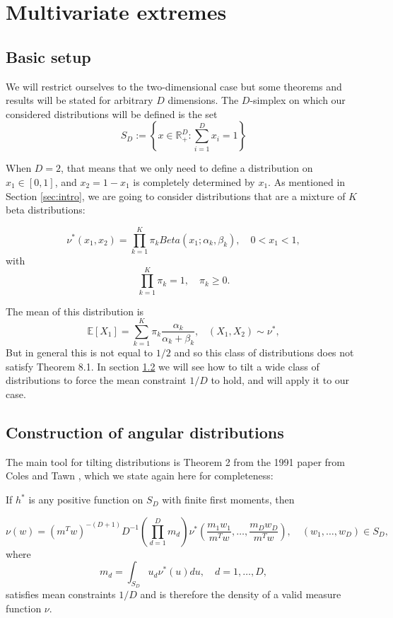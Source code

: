 \chapter{Multivariate extremes}
\label{sec:multivariate}
\section{Basic setup}

We will restrict ourselves to the two-dimensional case but some theorems and results will be stated for arbitrary $D$ dimensions. The $D$-simplex on which our considered distributions will be defined is the set
$$
S_D :=\left\{x \in \mathbb{R}^D_+ : \sum_{i=1}^D x_i = 1\right\}
$$

When $D=2$, that means that we only need to define a distribution on $ x_1 \in [0,1]$, and $x_2 = 1-x_1$ is completely determined by $x_1$. As mentioned in Section \ref{sec:intro}, we are going to consider distributions that are a mixture of $K$ beta distributions:

$$
\nu^*(x_1,x_2) = \prod_{k=1}^K \pi_k Beta(x_1;\alpha_k,\beta_k), \quad  0<x_1<1,
$$
with
$$
\prod_{k=1}^K \pi_k= 1, \quad \pi_k \geq 0 .
$$

The mean of this distribution is
$$
\mathbb{E}[X_1] = \sum_{k=1}^K \pi_k\frac{\alpha_k}{\alpha_k + \beta_k}, \hspace{10pt} (X_1,X_2) \sim \nu^*,
$$
But in general this is not equal to $1/2$ and so this class of distributions does not satisfy Theorem 8.1.
In section \ref{sec:tilting} we will see how to tilt a wide class of distributions to force the mean constraint $1/D$ to hold, and will apply it to our case.

\section{Construction of angular distributions}
\label{sec:tilting}

The main tool for tilting distributions is Theorem 2 from the 1991 paper from Coles and Tawn \cite{ColesTawn}, which we state again here for completeness:\\


\begin{theorem}

If $h^*$ is any positive function on $S_D$ with finite first moments, then

$$
\nu(w) = (m^Tw)^{-(D+1)}D^{-1} \left( \prod_{d=1}^{D}m_d \right) \nu^*\left(\frac{m_1w_1}{m^Tw}, \ldots , \frac{m_Dw_D}{m^Tw}\right),
\quad (w_1,\ldots,w_D) \in S_D,
$$
where
$$
m_d = \int_{S_D} u_d\nu^*(u)du, \quad d=1, \ldots ,D,
$$
satisfies mean constraints $1/D$ and is therefore the density of a valid measure function $\nu$.

\end{theorem}

